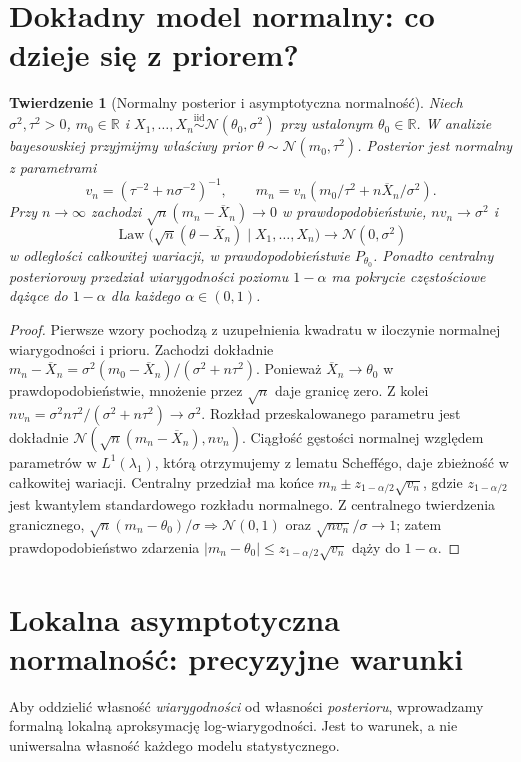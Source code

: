 \documentclass[11pt,a4paper,oneside]{report}
\numberwithin{equation}{chapter}
\theoremstyle{plain}
\newtheorem{twierdzenie}{Twierdzenie}[chapter]
\theoremstyle{definition}
\theoremstyle{remark}
\newcommand{\R}{\mathbb R}
\newcommand{\Law}{\operatorname{Law}}
\newcommand{\Normal}{\mathcal N}
\newcommand{\iid}{\mathrel{\overset{\mathrm{iid}}\sim}}
\begin{document}
\section{Dokładny model normalny: co dzieje się z priorem?}
\begin{twierdzenie}[Normalny posterior i asymptotyczna normalność]
\label{thm:normal-conjugate-bvm}
Niech $\sigma^2,\tau^2>0$, $m_0\in\R$ i
$X_1,\ldots,X_n\iid\Normal(\theta_0,\sigma^2)$
przy ustalonym $\theta_0\in\R$.
W analizie bayesowskiej przyjmijmy właściwy prior
$\theta\sim\Normal(m_0,\tau^2)$. Posterior jest normalny
z parametrami
\[
 v_n=(\tau^{-2}+n\sigma^{-2})^{-1},\qquad
 m_n=v_n\left(m_0/\tau^2+n\overline X_n/\sigma^2\right).
\]
Przy $n\to\infty$ zachodzi
$\sqrt n(m_n-\overline X_n)\to0$ w prawdopodobieństwie,
$n v_n\to\sigma^2$ i
\[
 \Law\big(\sqrt n(\theta-\overline X_n)\mid X_1,\ldots,X_n\big)
 \longrightarrow\Normal(0,\sigma^2)
\]
w odległości całkowitej wariacji, w prawdopodobieństwie
$P_{\theta_0}$. Ponadto centralny posteriorowy przedział
wiarygodności poziomu $1-\alpha$ ma pokrycie częstościowe
dążące do $1-\alpha$ dla każdego $\alpha\in(0,1)$.
\end{twierdzenie}
\begin{proof}
Pierwsze wzory pochodzą z uzupełnienia kwadratu
w iloczynie normalnej wiarygodności i prioru.
Zachodzi dokładnie
$m_n-\overline X_n=\sigma^2(m_0-\overline X_n)/
(\sigma^2+n\tau^2)$.
Ponieważ $\overline X_n\to\theta_0$ w prawdopodobieństwie,
mnożenie przez $\sqrt n$ daje granicę zero.
Z kolei $nv_n=\sigma^2n\tau^2/(\sigma^2+n\tau^2)\to\sigma^2$.
Rozkład przeskalowanego parametru jest dokładnie
$\Normal(\sqrt n(m_n-\overline X_n),nv_n)$.
Ciągłość gęstości normalnej względem parametrów
w $L^1(\lambda_1)$, którą otrzymujemy z lematu Scheffégo,
daje zbieżność w całkowitej wariacji.
Centralny przedział ma końce
$m_n\pm z_{1-\alpha/2}\sqrt{v_n}$,
gdzie $z_{1-\alpha/2}$ jest kwantylem standardowego
rozkładu normalnego. Z centralnego twierdzenia granicznego,
$\sqrt n(m_n-\theta_0)/\sigma\Rightarrow\Normal(0,1)$
oraz $\sqrt{nv_n}/\sigma\to1$; zatem prawdopodobieństwo
zdarzenia $|m_n-\theta_0|\le z_{1-\alpha/2}\sqrt{v_n}$
dąży do $1-\alpha$.
\end{proof}

\section{Lokalna asymptotyczna normalność: precyzyjne warunki}
Aby oddzielić własność \emph{wiarygodności} od własności
\emph{posterioru}, wprowadzamy formalną lokalną aproksymację
log-wiarygodności. Jest to warunek, a nie uniwersalna
własność każdego modelu statystycznego.
\end{document}
